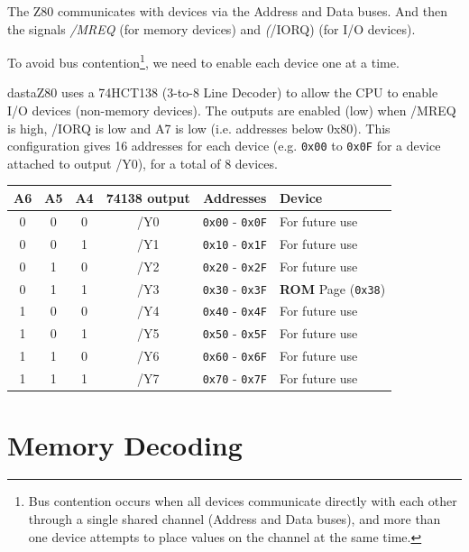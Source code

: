 \documentclass[a4paper,11pt]{article}
\begin{document}
    The Z80 communicates with devices via the Address and Data buses. And then
    the signals \textit{/MREQ} (for memory devices) and \textit(/IORQ) (for I/O
    devices).

    To avoid bus contention\footnote{Bus contention occurs when all devices
    communicate directly with each other through a single shared channel
    (Address and Data buses), and more than one device attempts to place values
    on the channel at the same time.}, we need to enable each device one at a
    time.

    dastaZ80 uses a 74HCT138 (3-to-8 Line Decoder) to allow the CPU to enable
    I/O devices (non-memory devices). The outputs are enabled (low) when /MREQ
    is high, /IORQ is low and A7 is low (i.e. addresses below 0x80). This
    configuration gives 16 addresses for each device (e.g. \texttt{0x00} to
    \texttt{0x0F} for a device attached to output /Y0), for a total of 8 devices.

    \begin{tabular}{| c | c | c | c | c | m{4.5cm} | }
        \hline
        \rowcolor{lightgray}
        A6 & A5 & A4 & 74138 output & Addresses & Device\\
        \hline
        0 & 0 & 0 & /Y0 & \texttt{0x00} - \texttt{0x0F} & For future use\\
        \hline
        0 & 0 & 1 & /Y1 & \texttt{0x10} - \texttt{0x1F} & For future use\\
        \hline
        0 & 1 & 0 & /Y2 & \texttt{0x20} - \texttt{0x2F} & For future use\\
        \hline
        0 & 1 & 1 & /Y3 & \texttt{0x30} - \texttt{0x3F} & \textbf{ROM} Page
        (\texttt{0x38})\\
        \hline
        1 & 0 & 0 & /Y4 & \texttt{0x40} - \texttt{0x4F} & For future use\\
        \hline
        1 & 0 & 1 & /Y5 & \texttt{0x50} - \texttt{0x5F} & For future use\\
        \hline
        1 & 1 & 0 & /Y6 & \texttt{0x60} - \texttt{0x6F} & For future use\\
        \hline
        1 & 1 & 1 & /Y7 & \texttt{0x70} - \texttt{0x7F} & For future use\\
        \hline
    \end{tabular}
    
    \pagebreak
    \section{Memory Decoding}
\end{document}
